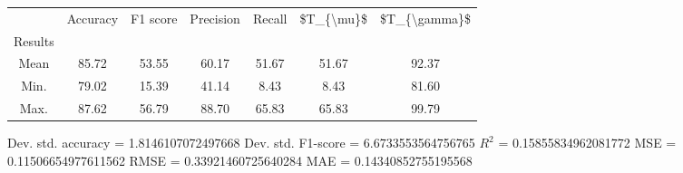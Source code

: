 \begin{tabular}{|c|c|c|c|c|c|c|}
\toprule
{} &  Accuracy &  F1 score &  Precision &  Recall &  \$T\_\{\textbackslash mu\}\$ &  \$T\_\{\textbackslash gamma\}\$ \\
Results &           &           &            &         &            &               \\
\hline
Mean    &     85.72 &     53.55 &      60.17 &   51.67 &      51.67 &         92.37 \\
Min.    &     79.02 &     15.39 &      41.14 &    8.43 &       8.43 &         81.60 \\
Max.    &     87.62 &     56.79 &      88.70 &   65.83 &      65.83 &         99.79 \\
\bottomrule
\end{tabular}

 Dev. std. accuracy = 1.8146107072497668
 Dev. std. F1-score = 6.6733553564756765
 $R^2$ = 0.15855834962081772
 MSE = 0.11506654977611562
 RMSE = 0.33921460725640284
 MAE = 0.14340852755195568